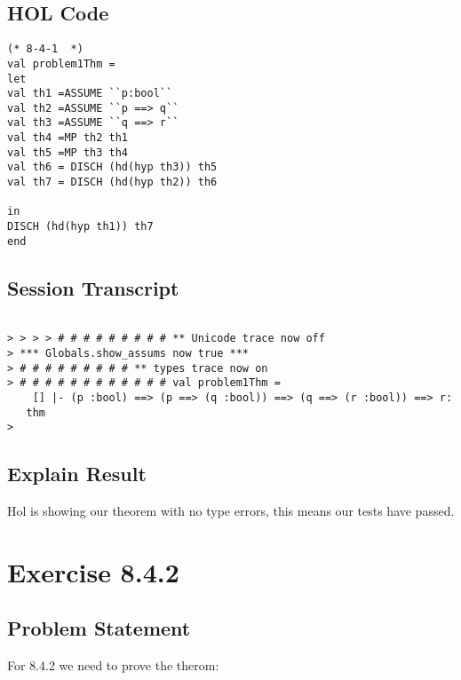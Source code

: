 \documentclass{report}
\begin{document}
\section{HOL Code}
\label{HOl Code 841}

\begin{lstlisting}[frame=trBL]
(* 8-4-1  *)
val problem1Thm =
let
val th1 =ASSUME ``p:bool``
val th2 =ASSUME ``p ==> q``
val th3 =ASSUME ``q ==> r``
val th4 =MP th2 th1
val th5 =MP th3 th4
val th6 = DISCH (hd(hyp th3)) th5
val th7 = DISCH (hd(hyp th2)) th6

in
DISCH (hd(hyp th1)) th7
end
\end{lstlisting}

\section{Session Transcript}
\label{Session Trans1}

\setcounter{sessioncount}{0}
\begin{session}
  \begin{scriptsize}
\begin{verbatim}

> > > > # # # # # # # # # ** Unicode trace now off
> *** Globals.show_assums now true ***
> # # # # # # # # # ** types trace now on
> # # # # # # # # # # # # val problem1Thm =
    [] |- (p :bool) ==> (p ==> (q :bool)) ==> (q ==> (r :bool)) ==> r:
   thm
> 
\end{verbatim}
  \end{scriptsize}
\end{session}

\section{Explain Result}
\label{eplain re 841}
Hol is showing our theorem with no type errors, this means our tests have passed.


\chapter{Exercise 8.4.2}
\label{ex 842}

\section{Problem Statement}
\label{problem state 842}
For 8.4.2 we need to prove the therom:
\HOLprojFiveTheoremsconjSymThm
\end{document}
